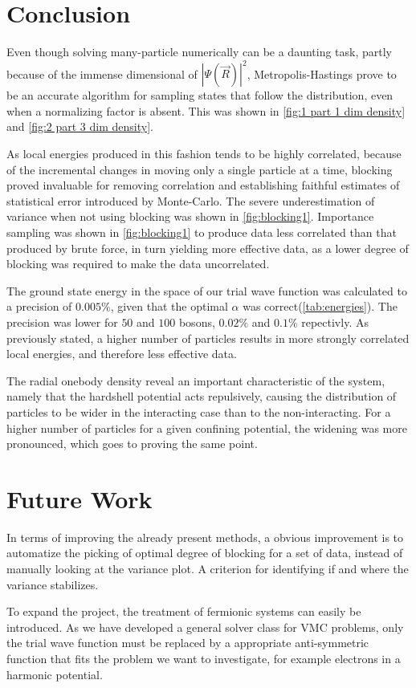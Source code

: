 \begin{minipage}{\columnwidth}
\section{Conclusion}\label{sec:Conclusion}
Even though solving many-particle numerically can be a daunting task, partly because of the immense dimensional of $|\Psi(\vec{R})|^2$, Metropolis-Hastings prove to be an accurate algorithm for sampling states that follow the distribution, even when a normalizing factor is absent. This was shown in \autoref{fig:1 part 1 dim density} and \autoref{fig:2 part 3 dim density}.

As local energies produced in this fashion tends to be highly correlated, because of the incremental changes in moving only a single particle at a time, blocking proved invaluable for removing correlation and establishing faithful estimates of statistical error introduced by Monte-Carlo. The severe underestimation of variance when not using blocking was shown in \autoref{fig:blocking1}.
Importance sampling was shown in \autoref{fig:blocking1} to produce data less correlated than that produced by brute force, in turn yielding more effective data, as a lower degree of blocking was required to make the data uncorrelated. 

The ground state energy in the space of our trial wave function was calculated to a precision of $0.005\%$, given that the optimal $\alpha$ was correct(\autoref{tab:energies}). The precision was lower for $50$ and $100$ bosons, $0.02\%$ and $0.1\%$ repectivly. As previously stated, a higher number of particles results in more strongly correlated local energies, and therefore less effective data. 

The radial onebody density reveal an important characteristic of the system, namely that the hardshell potential acts repulsively, causing the distribution of particles to be wider in the interacting case than to the non-interacting. For a higher number of particles for a given confining potential, the widening was more pronounced, which goes to proving the same point.  

\end{minipage}

\section{Future Work}
In terms of improving the already present methods, a obvious improvement is to automatize the picking of optimal degree of blocking for a set of data, instead of manually looking at the variance plot. A criterion for identifying if and where the variance stabilizes.

To expand the project, the treatment of fermionic systems can easily be introduced. As we have developed a general solver class for VMC problems, only the trial wave function must be replaced by a appropriate anti-symmetric function that fits the problem we want to investigate, for example electrons in a harmonic potential.   

